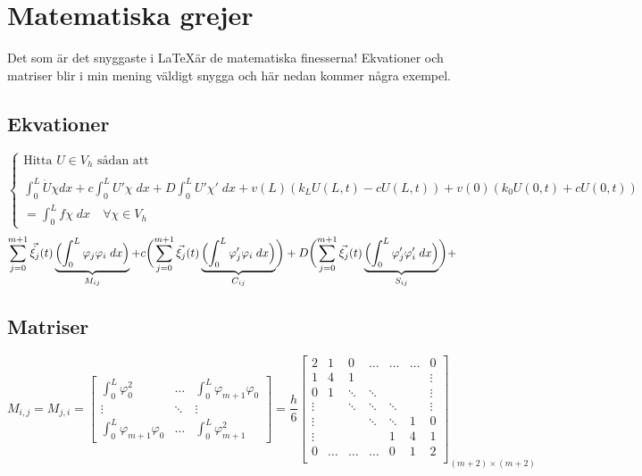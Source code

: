 \documentclass[]{article} %
\begin{document}
\section{Matematiska grejer}
Det som är det snyggaste i \LaTeX \space är de matematiska finesserna! Ekvationer och matriser blir i min mening väldigt snygga och här nedan kommer några exempel.\\
\subsection{Ekvationer}

$\left \{ \begin{array}{ll}
 \text{Hitta }  U \in V_{h} \text{ sådan att} \\ \\
 \displaystyle\int_{0}^{L} \dot{U}\chi dx + c\int_{0}^{L} U'\chi \;dx + D\int_{0}^{L} U'\chi' \;dx + v(L)(k_{L}U(L,t) - cU(L,t)) + v(0)(k_{0}U(0,t) + cU(0,t)) \\ = \int_{0}^{L} f\chi \;dx \quad \forall  \chi \in V_{h}
\end{array} \right. $ \\ 

\begin{equation}
   \sum_{j=0}^{m+1} \Vec{\dot{\xi_{j}}}(t) \underbrace { \Bigl (\int_{0}^{L} \varphi_{j}\varphi_{i}\;dx \Bigr ) }_{M_{ij}} + c \biggl ( \sum_{j=0}^{m+1} \Vec{\xi_{j}}(t) \underbrace{ \Bigl ( \int_{0}^{L} \varphi_{j}'\varphi_{i}\;dx \Bigr ) }_{C_{ij}} \biggr ) +D \biggl ( \sum_{j=0}^{m+1} \Vec{\xi_{j}}(t) \underbrace{ \Bigl ( \int_{0}^{L} \varphi_{j}'\varphi_{i}'\;dx \Bigr ) }_{S_{ij}} \biggr )+
\end{equation}

\subsection{Matriser}

\[ M_{i,j}=M_{j,i}=\left[ \begin{array}{ccc}

\int_{0}^{L}\varphi_{0}^2 & \dots & \int_{0}^{L}\varphi_{m+1}\varphi_0 \\
\vdots & \ddots & \vdots \\
\int_{0}^{L}\varphi_{m+1}\varphi_{0} & \dots & \int_{0}^{L}\varphi_{m+1}^2

\end{array} \right]
=\frac{h}{6}
\left[ \begin{array}{ccccccc}

2 & 1 & 0 & \dots & \dots & \dots & 0 \\
1 & 4 & 1 &  &  &  & \vdots \\
0 & 1 & \ddots & \ddots &  &  & \vdots \\
\vdots &  & \ddots & \ddots & \ddots &  & \vdots \\
\vdots &  &  & \ddots & \ddots & 1 & 0 \\
\vdots &  &  &  & 1 & 4 & 1 \\
0 & \dots & \dots & \dots & 0 & 1 & 2 \\

\end{array} \right]_{(m+2)\times(m+2)} \]
\end{document}
